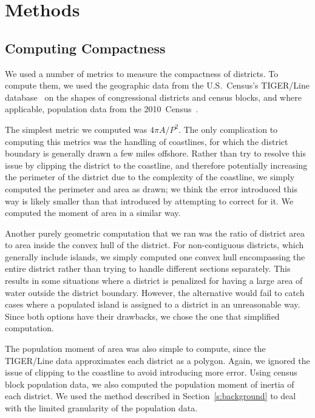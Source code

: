 \documentclass[12pt]{article}
\begin{document}
  \section{Methods}

  \subsection{Computing Compactness}

  We used a number of metrics to measure the compactness of districts.  To compute them, we used the geographic data from the U.S.~Census's TIGER/Line database~\cite{censustiger} on the shapes of congressional districts and census blocks, and where applicable, population data from the 2010~Census~\cite{census2010}.

  The simplest metric we computed was $4\pi A/P^2$.  The only complication to computing this metrics was the handling of coastlines, for which the district boundary is generally drawn a few miles offshore.  Rather than try to resolve this issue by clipping the district to the coastline, and therefore potentially increasing the perimeter of the district due to the complexity of the coastline, we simply computed the perimeter and area as drawn; we think the error introduced this way is likely smaller than that introduced by attempting to correct for it.  We computed the moment of area in a similar way.

  Another purely geometric computation that we ran was the ratio of district area to area inside the convex hull of the district. For non-contiguous districts, which generally include islands, we simply computed one convex hull encompassing the entire district rather than trying to handle different sections separately. This results in some situations where a district is penalized for having a large area of water outside the district boundary. However, the alternative would fail to catch cases where a populated island is assigned to a district in an unreasonable way. Since both options have their drawbacks, we chose the one that simplified computation.

  The population moment of area was also simple to compute, since the TIGER/Line data approximates each district as a polygon.  Again, we ignored the issue of clipping to the coastline to avoid introducing more error.  Using census block population data, we also computed the population moment of inertia of each district.  We used the method described in Section~\ref{s:background} to deal with the limited granularity of the population data.
\end{document}
